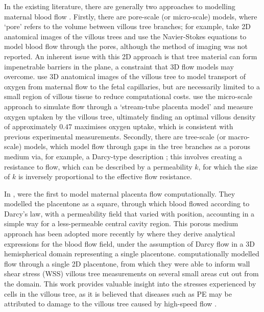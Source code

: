         In the existing literature, there are generally two approaches to modelling maternal blood flow \cite{jensenBloodFlowTransport2019}. Firstly, there are pore-scale (or micro-scale) models, where `pore' refers to the volume between villous tree branches; for example, \citeauthor{lecarpentierComputationalFluidDynamic2016} \cite{lecarpentierComputationalFluidDynamic2016} take 2D anatomical images of the villous trees and use the Navier-Stokes equations to model blood flow through the pores, although the method of imaging was not reported. An inherent issue with this 2D approach is that tree material can form impenetrable barriers in the plane, a constraint that 3D flow models may overcome. \citeauthor{perazzoloModellingEffectIntervillous2017} \cite{perazzoloModellingEffectIntervillous2017} use 3D anatomical images of the villous tree to model transport of oxygen from maternal flow to the fetal capillaries, but are necessarily limited to a small region of villous tissue to reduce computational costs. \citeauthor{serovOptimalVilliDensity2015} \cite{serovOptimalVilliDensity2015} use the micro-scale approach to simulate flow through a `stream-tube placenta model' and measure oxygen uptaken by the villous tree, ultimately finding an optimal villous density of approximately $0.47$ maximises oxygen uptake, which is consistent with previous experimental measurements. Secondly, there are tree-scale (or macro-scale) models, which model flow through gaps in the tree branches as a porous medium via, for example, a Darcy-type description \cite{lecarpentierComputationalFluidDynamic2016,chernyavskyMathematicalModelIntervillous2010,erianMaternalPlacentalBlood1977}; this involves creating a resistance to flow, which can be described by a permeability $k$, for which the size of $k$ is inversely proportional to the effective flow resistance.

        In \citeyear{erianMaternalPlacentalBlood1977}, \citeauthor{erianMaternalPlacentalBlood1977} \cite{erianMaternalPlacentalBlood1977} were the first to model maternal placenta flow computationally. They modelled the placentone as a square, through which blood flowed according to Darcy's law, with a permeability field that varied with position, accounting in a simple way for a less-permeable central cavity region. This porous medium approach has been adopted more recently by \citeauthor{chernyavskyMathematicalModelIntervillous2010} \cite{chernyavskyMathematicalModelIntervillous2010} where they derive analytical expressions for the blood flow field, under the assumption of Darcy flow in a 3D hemispherical domain representing a single placentone. \citeauthor{lecarpentierComputationalFluidDynamic2016} \cite{lecarpentierComputationalFluidDynamic2016} computationally modelled flow through a single 2D placentone, from which they were able to inform wall shear stress (WSS) villous tree measurements on several small areas cut out from the domain. This work provides valuable insight into the stresses experienced by cells in the villous tree, as it is believed that diseases such as PE may be attributed to damage to the villous tree caused by high-speed flow \cite{burtonRheologicalPhysiologicalConsequences2009}.

